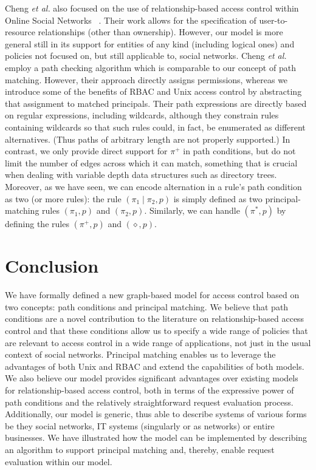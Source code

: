 \documentclass{article}
\begin{document}
Cheng {\em et al.} also focused on the use of relationship-based access control within Online Social Networks ~\cite{ChengPS12passat,ChengPS12dbsec}.
Their work allows for the specification of user-to-resource relationships (other than ownership).
However, our model is more general still in its support for entities of any kind (including logical ones) and policies not focused on, but still applicable to, social networks.
Cheng {\em et al.} employ a path checking algorithm which is comparable to our concept of path matching.
However, their approach directly assigns permissions, whereas we introduce some of the benefits of RBAC and Unix access control by abstracting that assignment to matched principals.
Their path expressions are directly based on regular expressions, including wildcards, although they constrain rules containing wildcards so that such rules could, in fact, be enumerated as different alternatives.
(Thus paths of arbitrary length are not properly supported.)
In contrast, we only provide direct support for $\pi^+$ in path conditions, but do not limit the number of edges across which it can match, something that is crucial when dealing with variable depth data structures such as directory trees.
Moreover, as we have seen, we can encode alternation in a rule's path condition as two (or more rules): the rule $(\pi_1 \mid \pi_2,p)$ is simply defined as two principal-matching rules $(\pi_1,p)$ and $(\pi_2,p)$.
Similarly, we can handle $(\pi^*,p)$ by defining the rules $(\pi^+,p)$ and $(\diamond,p)$.


\section{Conclusion}\label{sec:Conclusion}

We have formally defined a new graph-based model for access control based on two concepts: path conditions and principal matching.
We believe that path conditions are a novel contribution to the literature on relationship-based access control and that these conditions allow us to specify a wide range of policies that are relevant to access control in a wide range of applications, not just in the usual context of social networks.
Principal matching enables us to leverage the advantages of both Unix and RBAC and extend the capabilities of both models.
We also believe our model provides significant advantages over existing models for relationship-based access control, both in terms of the expressive power of path conditions and the relatively straightforward request evaluation process.
Additionally, our model is generic, thus able to describe systems of various forms be they social networks, IT systems (singularly or as networks) or entire businesses.
We have illustrated how the model can be implemented by describing an algorithm to support principal matching and, thereby, enable request evaluation within our model.
\end{document}
